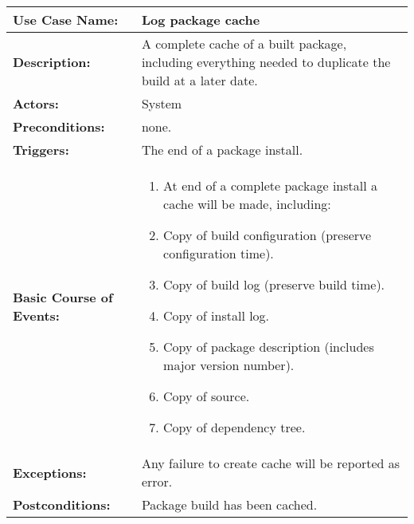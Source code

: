 
\begin{tabularx}{\linewidth}{|l|X|}
\hline
\textbf{Use Case Name:} & \textbf{Log package cache} \\
\hline
\textbf{Description:} & 
A complete cache of a built package, including everything needed to duplicate 
the build at a later date. \\
\hline
\textbf{Actors:} & System \\
\hline
\textbf{Preconditions:} & none. \\
\hline
\textbf{Triggers:} & The end of a package install. \\
\hline
\textbf{Basic Course of Events:} & 
\begin{minipage}{\linewidth} 
  \vspace{0.05em}
  \begin{enumerate}
    \item At end of a complete package install a cache will be made, including:
    \item Copy of build configuration (preserve configuration time).
    \item Copy of build log (preserve build time).
    \item Copy of install log.
    \item Copy of package description (includes major version number).
    \item Copy of source.
    \item Copy of dependency tree.
  \end{enumerate}
  \vspace{0.05em}
\end{minipage}
\\
\hline
\textbf{Exceptions:} & 
Any failure to create cache will be reported as error. \\
\hline 
\textbf{Postconditions:} &
Package build has been cached. \\
\hline
\end{tabularx}


